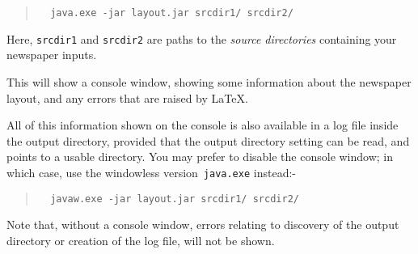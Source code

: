 \documentclass[a4paper,DIV=11]{scrartcl}
\begin{document}
\begin{quote}
\begin{verbatim}
  java.exe -jar layout.jar srcdir1/ srcdir2/
\end{verbatim}
\end{quote}

Here, \verb!srcdir1! and \verb!srcdir2! are paths to the
\textit{source directories} containing your newspaper inputs.

This will show a console window, showing some information about the
newspaper layout, and any errors that are raised by \LaTeX.

All of this information shown on the console is also available in a
log file inside the output directory, provided that the output
directory setting can be read, and points to a usable directory. You
may prefer to disable the console window; in which case, use the
windowless version~\texttt{java.exe} instead:-

\begin{quote}
\begin{verbatim}
  javaw.exe -jar layout.jar srcdir1/ srcdir2/
\end{verbatim}
\end{quote}

Note that, without a console window, errors relating to discovery of
the output directory or creation of the log file, will not be shown.
\end{document}
